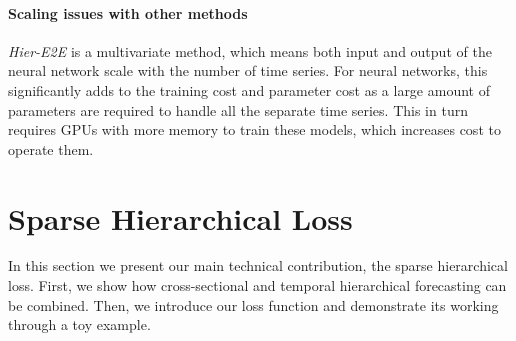 \documentclass[preprint, 3p, times, twocolumn]{elsarticle}
\begin{document}
\paragraph{Scaling issues with other methods} \label{sec:scalingissuesneuralmethods} \textit{Hier-E2E} \cite{rangapuram_endtoend_2021} is a multivariate method, which means both input and output of the neural network scale with the number of time series. For neural networks, this significantly adds to the training cost and parameter cost as a large amount of parameters are required to handle all the separate time series. This in turn requires GPUs with more memory to train these models, which increases cost to operate them. 

\section{Sparse Hierarchical Loss} \label{sec:sparsehloss}
In this section we present our main technical contribution, the sparse hierarchical loss. First, we show how cross-sectional and temporal hierarchical forecasting can be combined. Then, we introduce our loss function and demonstrate its working through a toy example.
\end{document}
